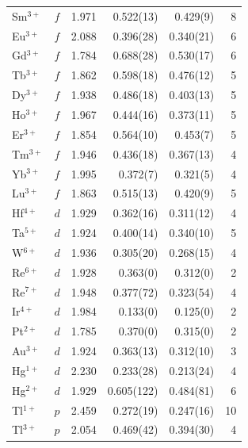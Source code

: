 \begin{longtable}{l l r r r r}
  Sm$^{3+}$            & $f$   & 1.971 &      0.522(13) &       0.429(9) & 8 \\
  Eu$^{3+}$            & $f$   & 2.088 &      0.396(28) &      0.340(21) & 6 \\
  Gd$^{3+}$            & $f$   & 1.784 &      0.688(28) &      0.530(17) & 6 \\
  Tb$^{3+}$            & $f$   & 1.862 &      0.598(18) &      0.476(12) & 5 \\
  Dy$^{3+}$            & $f$   & 1.938 &      0.486(18) &      0.403(13) & 5 \\
  Ho$^{3+}$            & $f$   & 1.967 &      0.444(16) &      0.373(11) & 5 \\
  Er$^{3+}$            & $f$   & 1.854 &      0.564(10) &       0.453(7) & 5 \\
  Tm$^{3+}$            & $f$   & 1.946 &      0.436(18) &      0.367(13) & 4 \\
  Yb$^{3+}$            & $f$   & 1.995 &       0.372(7) &       0.321(5) & 4 \\
  Lu$^{3+}$            & $f$   & 1.863 &      0.515(13) &       0.420(9) & 5 \\
  Hf$^{4+}$            & $d$   & 1.929 &      0.362(16) &      0.311(12) & 4 \\
  Ta$^{5+}$            & $d$   & 1.924 &      0.400(14) &      0.340(10) & 5 \\
  W$^{6+}$             & $d$   & 1.936 &      0.305(20) &      0.268(15) & 4 \\
  Re$^{6+}$            & $d$   & 1.928 &       0.363(0) &       0.312(0) & 2 \\
  Re$^{7+}$            & $d$   & 1.948 &      0.377(72) &      0.323(54) & 4 \\
  Ir$^{4+}$            & $d$   & 1.984 &       0.133(0) &       0.125(0) & 2 \\
  Pt$^{2+}$            & $d$   & 1.785 &       0.370(0) &       0.315(0) & 2 \\
  Au$^{3+}$            & $d$   & 1.924 &      0.363(13) &      0.312(10) & 3 \\
  Hg$^{1+}$            & $d$   & 2.230 &      0.233(28) &      0.213(24) & 4 \\
  Hg$^{2+}$            & $d$   & 1.929 &     0.605(122) &      0.484(81) & 6 \\
  Tl$^{1+}$            & $p$   & 2.459 &      0.272(19) &      0.247(16) & 10 \\
  Tl$^{3+}$            & $p$   & 2.054 &      0.469(42) &      0.394(30) & 4 \\

\end{longtable}
